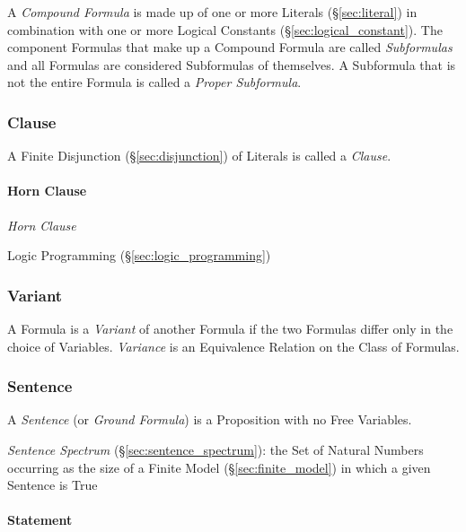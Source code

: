 A \emph{Compound Formula} is made up of one or more Literals
(\S\ref{sec:literal}) in combination with one or more Logical
Constants (\S\ref{sec:logical_constant}). The component Formulas that
make up a Compound Formula are called \emph{Subformulas} and all
Formulas are considered Subformulas of themselves. A Subformula that
is not the entire Formula is called a \emph{Proper Subformula}.



\subsubsection{Clause}\label{sec:clause}

A Finite Disjunction (\S\ref{sec:disjunction}) of Literals is called a
\emph{Clause}.



\paragraph{Horn Clause}\label{sec:horn_clause}\hfill

\emph{Horn Clause}

\fist Logic Programming (\S\ref{sec:logic_programming})



\subsubsection{Variant}\label{sec:variant}

A Formula is a \emph{Variant} of another Formula if the two Formulas
differ only in the choice of Variables. \emph{Variance} is an
Equivalence Relation on the Class of Formulas.



\subsubsection{Sentence}\label{sec:sentence}

A \emph{Sentence} (or \emph{Ground Formula}) is a Proposition with no
Free Variables.

\emph{Sentence Spectrum} (\S\ref{sec:sentence_spectrum}): the Set of Natural
Numbers occurring as the size of a Finite Model
(\S\ref{sec:finite_model}) in which a given Sentence is True



\paragraph{Statement}\label{sec:statement}\hfill

